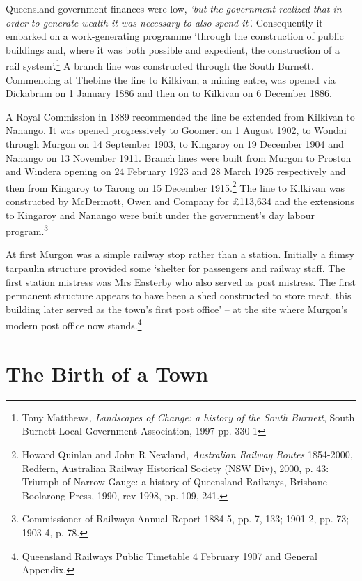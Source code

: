 Queensland government finances were low, \emph{`but the government realized that in order to generate wealth it was necessary to also spend it'.} Consequently it embarked on a work-generating programme `through the construction of public buildings and, where it was both possible and expedient, the construction of a rail system'.\footnote{Tony Matthews\emph{, Landscapes of Change: a history of the South Burnett}, South Burnett Local Government Association, 1997 pp. 330-1} A branch line was constructed through the South Burnett. Commencing at Thebine the line to Kilkivan, a mining entre, was opened via Dickabram on 1 January 1886 and then on to Kilkivan on 6 December 1886.


A Royal Commission in 1889 recommended the line be extended from Kilkivan to Nanango. It was opened progressively to Goomeri on 1 August 1902, to Wondai through Murgon on 14 September 1903, to Kingaroy on 19 December 1904 and Nanango on 13 November 1911. Branch lines were built from Murgon to Proston and Windera opening on 24 February 1923 and 28 March 1925 respectively and then from Kingaroy to Tarong on 15 December 1915.\footnote{Howard Quinlan and John R Newland, \emph{Australian Railway Routes} 1854-2000, Redfern, Australian Railway Historical Society (NSW Div), 2000, p. 43: Triumph of Narrow Gauge: a history of Queensland Railways, Brisbane Boolarong Press, 1990, rev 1998, pp. 109, 241.} The line to Kilkivan was constructed by McDermott, Owen and Company for \pounds113,634 and the extensions to Kingaroy and Nanango were built under the government's day labour program.\footnote{Commissioner of Railways Annual Report 1884-5, pp. 7, 133; 1901-2, pp. 73; 1903-4, p. 78.}


At first Murgon was a simple railway stop rather than a station. Initially a flimsy tarpaulin structure provided some `shelter for passengers and railway staff. The first station mistress was Mrs Easterby who also served as post mistress. The first permanent structure appears to have been a shed constructed to store meat, this building later served as the town's first post office' -- at the site where Murgon's modern post office now stands.\footnote{Queensland Railways Public Timetable 4 February 1907 and General Appendix.}


\balance


\printendnotes[custom]
\setcounter{endnote}{0}
\chapter{The Birth of a Town}
\nobalance


